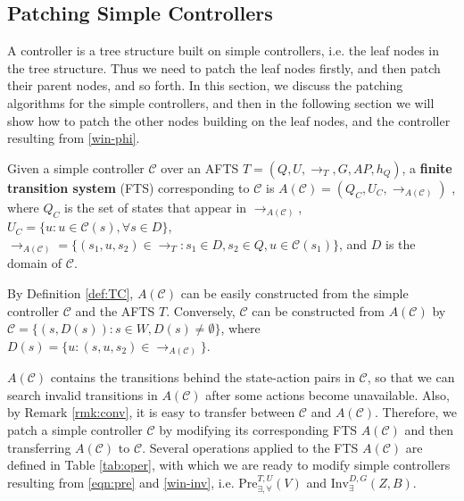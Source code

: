 

\subsection{Patching Simple Controllers}
\label{sec:patch-simple}
A controller is a tree structure built on simple controllers, i.e. the leaf nodes in the tree structure. Thus we need to patch the leaf nodes firstly, and then patch their parent nodes, and so forth.  In this section, we discuss the patching algorithms for the simple controllers, and then in the following section we will show how to patch the other nodes building on the leaf nodes, and the controller resulting from \eqref{win-phi}. 

\begin{definition}
	Given a simple controller $ \mathcal{C} $ over an AFTS $T = (Q,U,\rightarrow_T, G,AP,h_Q) $, a \textbf{finite transition system} (FTS) corresponding to $ \mathcal{C} $ is $A(\mathcal{C}) = (Q_C, U_C, \rightarrow_{A(\mathcal{C})})$ %
	, where $ Q_C $ is the set of states that appear in $ \rightarrow_{A(\mathcal{C})} $, $ U_C=\{u: u\in \mathcal{C}(s), \forall s\in D\} $, $ \rightarrow_{A(\mathcal{C})} =\{(s_1,u,s_2)\in \rightarrow_T: s_1\in D,s_2\in Q, u\in \mathcal{C}(s_1)\} ${\color{teal}, and $ D $ is the domain of $ \mathcal{C} $}. \label{def:TC}
\end{definition}

\begin{remark}
	By Definition \ref{def:TC}, $ A(\mathcal{C}) $ can be easily constructed from the simple controller $ \mathcal{C} $ and the AFTS $ T $. Conversely, $ \mathcal{C} $ can be constructed from $ A(\mathcal{C}) $ by $ \mathcal{C} = \{(s,D(s)):s\in W,D(s)\not=\emptyset\} $, where $ D(s)=\{u:(s,u,s_2)\in \rightarrow_{A(\mathcal{C})}\} $.\label{rmk:conv}
\end{remark}
{\color{teal} $ A(\mathcal{C}) $ contains the transitions behind the state-action pairs in $ \mathcal{C} $, so that we can search invalid transitions in $ A(\mathcal{C}) $ after some actions become unavailable. Also, by Remark \ref{rmk:conv}, it is easy to transfer between  $ \mathcal{C} $ and $ A(\mathcal{C}) $.} Therefore, we patch a simple controller $ \mathcal{C} $ by modifying its corresponding FTS $ A(\mathcal{C}) $ and then transferring $ A(\mathcal{C}) $ to $ \mathcal{C} $. Several operations applied to the FTS $ A(\mathcal{C}) $ are defined in Table \ref{tab:oper}, with which we are ready to modify simple controllers resulting from \eqref{eqn:pre} and \eqref{win-inv}, i.e. $ \text{Pre}_{\exists,\forall}^{T, U}(V) $ and $ \text{Inv}_{\exists}^{D,G}(Z,B) $. %

